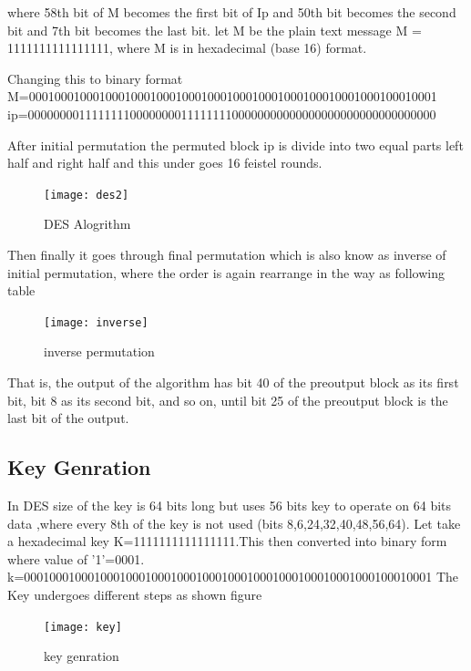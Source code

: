 \documentclass[11pt]{article}
\begin{document}
 where 58th bit of M becomes the first bit of Ip and 50th bit becomes the second bit and 7th bit becomes the last bit.
let M be the plain text message M = 1111111111111111, where M is in hexadecimal (base 16) format.
  
  Changing this to binary format\newline
 M=0001000100010001000100010001000100010001000100010001000100010001 
 ip=0000000011111111000000001111111100000000000000000000000000000000\newline
 
 After initial permutation the permuted block ip is divide into two equal parts left half and right half and this under goes 16 feistel rounds.
 \begin{figure}[h!]
 	\begin{center}
 		\texttt{[image: des2]}
 	\end{center}
 	\caption{DES Alogrithm  }\label{nice_figure3}
 \end{figure}
 \newline
 
  Then finally it goes through final permutation which is also know as inverse of initial permutation, where the order is again rearrange in the way as following table
  \begin{figure}[!h]
  	\begin{center}
  		\texttt{[image: inverse]}
  	\end{center}
  	\caption{inverse permutation}\label{nice_figure4}
  \end{figure}
\newline

That is, the output of the algorithm has bit 40 of the preoutput block as its first bit, bit 8 as its second bit, and so on, until bit 25 of the preoutput block is the last bit of the output.
\subsection{Key Genration}
In DES size of the key is 64 bits long but uses 56 bits key to operate on 64 bits data ,where every 8th of the key is not used (bits 8,6,24,32,40,48,56,64).
Let take a hexadecimal key K=1111111111111111.This then converted into binary form
where value of '1'=0001.\newline
k=0001000100010001000100010001000100010001000100010001000100010001\newline 
The Key undergoes different steps  as shown figure
 \begin{figure}[!h]
	\begin{center}
		\texttt{[image: key]}
	\end{center}
	\caption{key genration}\label{nice_figure6}
\end{figure}
\end{document}
